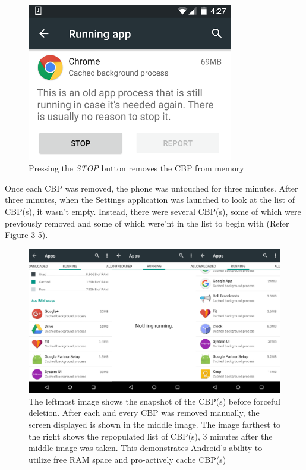 \documentclass[12pt]{uthesis-v12}  %
\begin{document}
					\begin{figure}[!ht]
						\centering
						\includegraphics[width = 90mm]{images/removeCBP3.png}
						\caption[Remove CBP]
						{Pressing the {\em STOP} button removes the CBP from memory}
					\end{figure}					
					
					Once each CBP was removed, the phone was untouched for three minutes. After three minutes, when the Settings application was launched to look at the list of CBP(s), it wasn't empty. Instead, there were several CBP(s), some of which were previously removed and some of which were'nt in the list to begin with (Refer Figure 3-5). 
					
					\begin{figure}[!ht]
						\centering
						\includegraphics[width = 130mm]{images/stage123.png}
						\caption[CBP(s) before and after manual removal]
						{The leftmost image shows the snapshot of the CBP(s) before forceful deletion. After each and every CBP was removed manually, the screen displayed is shown in the middle image. The image farthest to the right shows the repopulated list of CBP(s), 3 minutes after the middle image was taken. This demonstrates Android's ability to utilize free RAM space and pro-actively cache CBP(s)}
					\end{figure}					
					
\end{document}

